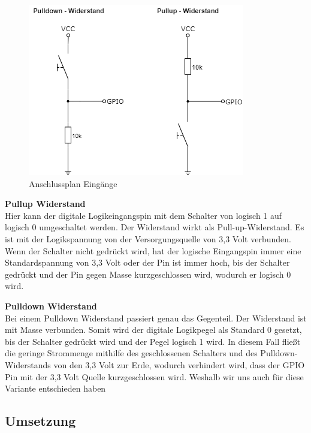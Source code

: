 \begin{figure}[H]
	\begin{center}
		\includegraphics[scale=0.55]{figures/hcis/input.png}
			\caption{Anschlussplan Eingänge}
			\label{fig:input}
	\end{center}
\end{figure}

\textbf{Pullup Widerstand}\\

Hier kann der digitale Logikeingangspin mit dem Schalter von logisch 1 auf logisch 0 umgeschaltet werden. Der Widerstand wirkt als Pull-up-Widerstand. Es ist mit der Logikspannung von der Versorgungsquelle von 3,3 Volt verbunden. Wenn der Schalter nicht gedrückt wird, hat der logische Eingangspin immer eine Standardspannung von 3,3 Volt oder der Pin ist immer hoch, bis der Schalter gedrückt und der Pin gegen Masse kurzgeschlossen wird, wodurch er logisch 0 wird.\\\medskip

\textbf{Pulldown Widerstand}\\

Bei einem Pulldown Widerstand passiert genau das Gegenteil. Der Widerstand ist mit Masse verbunden. Somit wird der digitale Logikpegel als Standard 0 gesetzt, bis der Schalter gedrückt wird und der Pegel logisch 1 wird. In diesem Fall fließt die geringe Strommenge mithilfe des geschlossenen Schalters und des Pulldown-Widerstands von den 3,3 Volt zur Erde, wodurch verhindert wird, dass der GPIO Pin mit der 3,3 Volt Quelle kurzgeschlossen wird. Weshalb wir uns auch für diese Variante entschieden haben

\newpage

\subsection{Umsetzung}

